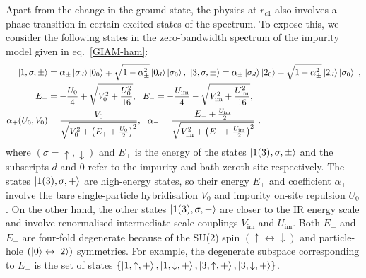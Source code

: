 Apart from the change in the ground state, the physics at \(r_{c1}\) also involves a phase transition in certain excited states of the spectrum. To expose this, we consider the following states in the zero-bandwidth spectrum of the impurity model given in eq.~\eqref{GIAM-ham}:
\begin{equation}\begin{aligned}
	\label{esqpt-1}
	\ket{1,\sigma,\pm} &= \alpha_\pm \ket{\sigma_d}\ket{0_0} \mp \sqrt{1 - \alpha_\pm^2}\ket{0_d}\ket{\sigma_0}, ~\ket{3,\sigma,\pm} = \alpha_\pm \ket{\sigma_d}\ket{2_0} \mp \sqrt{1 - \alpha_\pm^2}\ket{2_d}\ket{\sigma_0} ~,\\
	E_+ &= -\frac{U_0}{4} + \sqrt{V_0^2 + \frac{U_0^2}{16}}, ~~E_- = -\frac{U_\text{im}}{4} - \sqrt{V_{\text{im}}^2 + \frac{U_{\text{im}}^2}{16}},\\
	\alpha_+(U_0,V_0) &= \frac{V_0}{\sqrt{V_0^2 + \left(E_+ + \frac{U_0}{2}\right)^2 }}, ~ ~\alpha_- = \frac{E_- + \frac{U_\text{im}}{2}}{\sqrt{V_\text{im}^2 + \left(E_- + \frac{U_\text{im}}{2}\right)^2 }}~.
\end{aligned}\end{equation}
where \(\left(\sigma=\uparrow,\downarrow\right)\) and \(E_\pm\) is the energy of the states \(\ket{1(3),\sigma,\pm}\) and the subscripts $d$ and $0$ refer to the impurity and bath zeroth site respectively. The states \(\ket{1(3),\sigma,+}\) are high-energy states, so their energy \(E_+\) and coefficient \(\alpha_+\) involve the bare single-particle hybridisation \(V_0\) and impurity on-site repulsion $U_{0}$. On the other hand, the other states \(\ket{1(3),\sigma,-}\) are closer to the IR energy scale and involve renormalised intermediate-scale couplings \(V_\text{im}\) and $U_{\text{im}}$. 
Both \(E_+\) and \(E_-\) are four-fold degenerate because of the SU(2) spin \((\uparrow \leftrightarrow \downarrow)\) and particle-hole \((\ket{0} \leftrightarrow \ket{2})\) symmetries. For example, the degenerate subspace corresponding to \(E_+\) is the set of states \(\left\{\ket{1,\uparrow,+}, \ket{1,\downarrow,+}, \ket{3,\uparrow,+}, \ket{3,\downarrow,+}\right\}\). 

